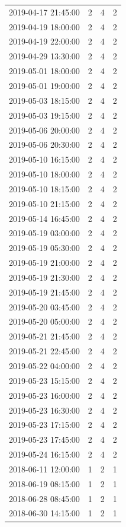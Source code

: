 \begin{tabular}{lrrr}
2019-04-17 21:45:00 & 2 & 4 & 2 \\
2019-04-19 18:00:00 & 2 & 4 & 2 \\
2019-04-19 22:00:00 & 2 & 4 & 2 \\
2019-04-29 13:30:00 & 2 & 4 & 2 \\
2019-05-01 18:00:00 & 2 & 4 & 2 \\
2019-05-01 19:00:00 & 2 & 4 & 2 \\
2019-05-03 18:15:00 & 2 & 4 & 2 \\
2019-05-03 19:15:00 & 2 & 4 & 2 \\
2019-05-06 20:00:00 & 2 & 4 & 2 \\
2019-05-06 20:30:00 & 2 & 4 & 2 \\
2019-05-10 16:15:00 & 2 & 4 & 2 \\
2019-05-10 18:00:00 & 2 & 4 & 2 \\
2019-05-10 18:15:00 & 2 & 4 & 2 \\
2019-05-10 21:15:00 & 2 & 4 & 2 \\
2019-05-14 16:45:00 & 2 & 4 & 2 \\
2019-05-19 03:00:00 & 2 & 4 & 2 \\
2019-05-19 05:30:00 & 2 & 4 & 2 \\
2019-05-19 21:00:00 & 2 & 4 & 2 \\
2019-05-19 21:30:00 & 2 & 4 & 2 \\
2019-05-19 21:45:00 & 2 & 4 & 2 \\
2019-05-20 03:45:00 & 2 & 4 & 2 \\
2019-05-20 05:00:00 & 2 & 4 & 2 \\
2019-05-21 21:45:00 & 2 & 4 & 2 \\
2019-05-21 22:45:00 & 2 & 4 & 2 \\
2019-05-22 04:00:00 & 2 & 4 & 2 \\
2019-05-23 15:15:00 & 2 & 4 & 2 \\
2019-05-23 16:00:00 & 2 & 4 & 2 \\
2019-05-23 16:30:00 & 2 & 4 & 2 \\
2019-05-23 17:15:00 & 2 & 4 & 2 \\
2019-05-23 17:45:00 & 2 & 4 & 2 \\
2019-05-24 16:15:00 & 2 & 4 & 2 \\
2018-06-11 12:00:00 & 1 & 2 & 1 \\
2018-06-19 08:15:00 & 1 & 2 & 1 \\
2018-06-28 08:45:00 & 1 & 2 & 1 \\
2018-06-30 14:15:00 & 1 & 2 & 1 \\

\end{tabular}
